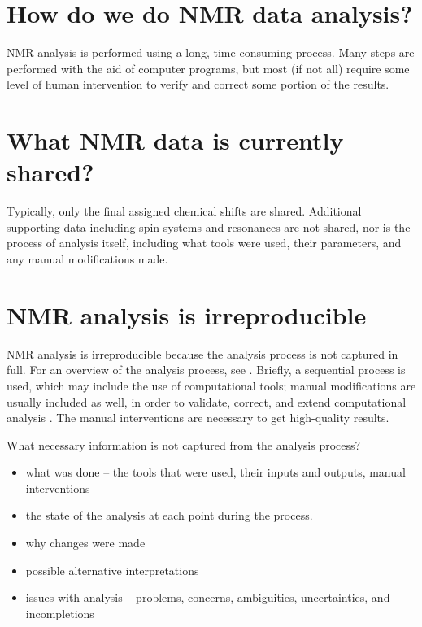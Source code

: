 \section{How do we do NMR data analysis?}
NMR analysis is performed using a long, time-consuming process.  Many steps
are performed with the aid of computer programs, but most (if not all) require
some level of human intervention to verify and correct some portion of the
results.



\section{What NMR data is currently shared?}
Typically, only the final assigned chemical shifts are shared.  Additional 
supporting data including spin systems and resonances are not shared, nor is
the process of analysis itself, including what tools were used, their parameters,
and any manual modifications made.



\section{NMR analysis is irreproducible}
NMR analysis is irreproducible because the analysis process is not captured
in full.  For an overview of the analysis process, see \cite{guerry2011automated,
guntert2009automated, williamson2009automated}.  Briefly, a sequential process
is used, which may include the use of computational tools; manual modifications
are usually included as well, in order to validate, correct, and extend
computational analysis \cite{guerry2011automated, guntert2009automated, 
williamson2009automated}.  The manual interventions are necessary to get high-quality
results.

What necessary information is not captured from the analysis process?
\begin{itemize}
  \item what was done -- the tools that were used, their inputs and outputs,
    manual interventions
  
  \item the state of the analysis at each point during the process.
  
  \item why changes were made
  
  \item possible alternative interpretations
  
  \item issues with analysis -- problems, concerns, ambiguities, uncertainties,
    and incompletions
\end{itemize}



